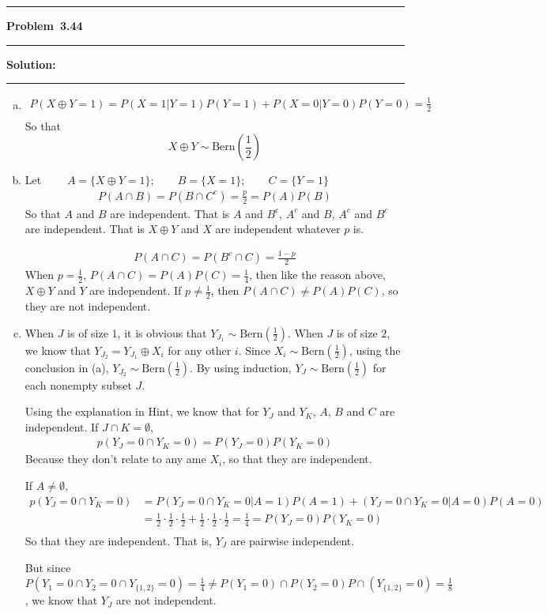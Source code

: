 \documentclass[10.5pt]{article}
\newcommand\question[1]{\vspace{.2in}\hrule\vspace{0.04in}\textbf{Problem\ #1}\vspace{.4em}\hrule\vspace{.10in}}
\newcommand\Solution{\vspace{.3in}\textbf{Solution:}\vspace{.5em}\hrule\vspace{.08in}\par}
\begin{document}
\question{3.44}
\Solution{}
\begin{enumerate}[(a)]
	\item \vspace{1cm}\begin{align*}
		P(X\oplus Y = 1) = P(X = 1|Y = 1)P(Y = 1)+P(X = 0|Y = 0)P(Y = 0) = \frac{1}{2}\\[6pt]
	\end{align*}
		So that $$X\oplus Y\sim\text{Bern}(\frac{1}{2})$$

	\item Let $\qquad A = \{X\oplus Y = 1\};\qquad B = \{X = 1\};\qquad C = \{Y = 1\}$
	\begin{align*}
		P(A\cap B) = P(B\cap C^c) = \frac{p}{2} = P(A)P(B)
	\end{align*}
	So that $A$ and $B$ are independent. That is $A$ and $B^c$, $A^c$ and $B$, $A^c$ and $B^c$ are independent. That is $X\oplus Y$ and $X$ are independent whatever $p$ is.

	\begin{align*}
		P(A\cap C) = P(B^c\cap C) = \frac{1-p}{2}
	\end{align*}
	When $p = \frac{1}{2}$, $P(A\cap C) = P(A)P(C) = \frac{1}{4}$, then like the reason above, $X\oplus Y$ and $Y$ are independent. If $p\neq \frac{1}{2}$, then $P(A\cap C) \neq P(A)P(C)$, so they are not independent.
	\vspace{1cm}
	\item When $J$ is of size $1$, it is obvious that $Y_{J_1}\sim \text{Bern}(\frac{1}{2})$. When $J$ is of size $2$, we know that $Y_{J_2} = Y_{J_1}\oplus X_i$ for any other $i$. Since $X_i\sim \text{Bern}(\frac{1}{2})$, using the conclusion in (a), $Y_{J_2}\sim \text{Bern}(\frac{1}{2})$.
	By using induction, $Y_J\sim \text{Bern}(\frac{1}{2})$ for each nonempty subset $J$.

	Using the explanation in Hint, we know that for $Y_J$ and $Y_K$, $A$, $B$ and $C$ are independent. If $J\cap K = \emptyset$,
	\begin{align*}
		p(Y_J = 0\cap Y_K = 0) = P(Y_J = 0)P(Y_K = 0)
	\end{align*}
	Because they don't relate to any ame $X_i$, so that they are independent.

	If $A \neq \emptyset$,
	\begin{align*}
		p(Y_J = 0\cap Y_K = 0) 
		&= P(Y_J = 0\cap Y_K = 0|A = 1)P(A=1)+(Y_J = 0\cap Y_K = 0|A=0)P(A=0)\\[6pt]
		&= \frac{1}{2}\cdot\frac{1}{2}\cdot\frac{1}{2}+\frac{1}{2}\cdot\frac{1}{2}\cdot\frac{1}{2} = \frac{1}{4} = P(Y_J = 0)P(Y_K = 0)\\[6pt]
	\end{align*}So that they are independent. That is, $Y_J$ are pairwise independent.
	
	But since $P(Y_{1} = 0\cap Y_{2} = 0\cap Y_{\{1, 2\}} = 0) = \frac{1}{4}\neq P(Y_{1} = 0)\cap P(Y_{2} = 0)P\cap(Y_{\{1, 2\}} = 0) = \frac{1}{8}$, we know that $Y_J$ are not independent.
\end{enumerate}
\end{document}

